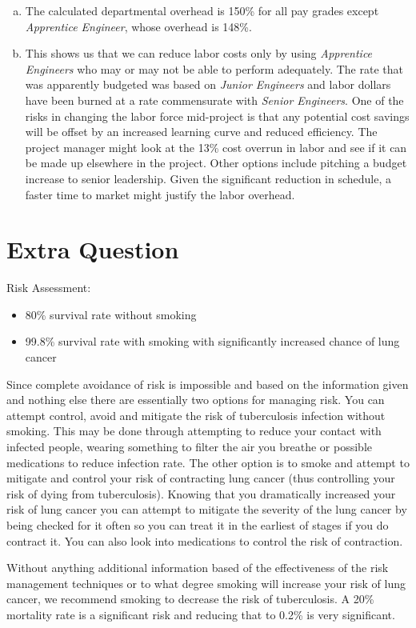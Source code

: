 \documentclass[letterpaper,10pt]{article}
\begin{document}
\begin{enumerate}[a.]
\item The calculated departmental overhead is 150\% for all pay grades except \emph{Apprentice Engineer}, whose overhead is 148\%.
\item This shows us that we can reduce labor costs only by using \emph{Apprentice Engineers} who may or may not be able to perform adequately.  The rate that was apparently budgeted was based on \emph{Junior Engineers} and labor dollars have been burned at a rate commensurate with \emph{Senior Engineers}.  One of the risks in changing the labor force mid-project is that any potential cost savings will be offset by an increased learning curve and reduced efficiency.  The project manager might look at the 13\% cost overrun in labor and see if it can be made up elsewhere in the project.  Other options include pitching a budget increase to senior leadership.  Given the significant reduction in schedule, a faster time to market might justify the labor overhead.
\end{enumerate}

\section*{Extra Question}
Risk Assessment:
\begin{itemize}
\item 80\% survival rate without smoking
\item 99.8\% survival rate with smoking with significantly increased chance of lung cancer
\end{itemize}

Since complete avoidance of risk is impossible and based on the information given and nothing else there are essentially two options for managing risk.  You can attempt control, avoid and mitigate the risk of tuberculosis infection without smoking.  This may be done through attempting to reduce your contact with infected people, wearing something to filter the air you breathe or possible medications to reduce infection rate.  The other option is to smoke and attempt to mitigate and control your risk of contracting lung cancer (thus controlling your risk of dying from tuberculosis).  Knowing that you dramatically increased your risk of lung cancer you can attempt to mitigate the severity of the lung cancer by being checked for it often so you can treat it in the earliest of stages if you do contract it.  You can also look into medications to control the risk of contraction.

Without anything additional information based of the effectiveness of the risk management techniques or to what degree smoking will increase your risk of lung cancer, we recommend smoking to decrease the risk of tuberculosis.  A 20\% mortality rate is a significant risk and reducing that to 0.2\% is very significant.  
\end{document}
